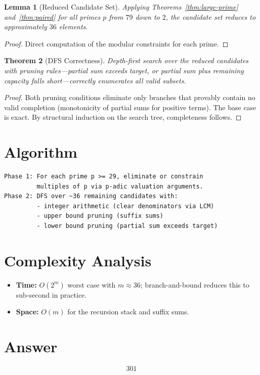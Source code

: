 \documentclass[12pt]{article}
\newtheorem{theorem}{Theorem}
\newtheorem{lemma}[theorem]{Lemma}
\begin{document}
\begin{lemma}[Reduced Candidate Set]
Applying Theorems~\ref{thm:large-prime} and~\ref{thm:paired} for all primes $p$ from $79$ down to $2$, the candidate set reduces to approximately $36$ elements.
\end{lemma}

\begin{proof}
Direct computation of the modular constraints for each prime.
\end{proof}

\begin{theorem}[DFS Correctness]
Depth-first search over the reduced candidates with pruning rules---partial sum exceeds target, or partial sum plus remaining capacity falls short---correctly enumerates all valid subsets.
\end{theorem}

\begin{proof}
Both pruning conditions eliminate only branches that provably contain no valid completion (monotonicity of partial sums for positive terms). The base case is exact. By structural induction on the search tree, completeness follows.
\end{proof}

\section{Algorithm}

\begin{verbatim}
Phase 1: For each prime p >= 29, eliminate or constrain
         multiples of p via p-adic valuation arguments.
Phase 2: DFS over ~36 remaining candidates with:
         - integer arithmetic (clear denominators via LCM)
         - upper bound pruning (suffix sums)
         - lower bound pruning (partial sum exceeds target)
\end{verbatim}

\section{Complexity Analysis}

\begin{itemize}
    \item \textbf{Time:} $O(2^m)$ worst case with $m \approx 36$; branch-and-bound reduces this to sub-second in practice.
    \item \textbf{Space:} $O(m)$ for the recursion stack and suffix sums.
\end{itemize}

\section{Answer}

\[
\boxed{301}
\]
\end{document}
